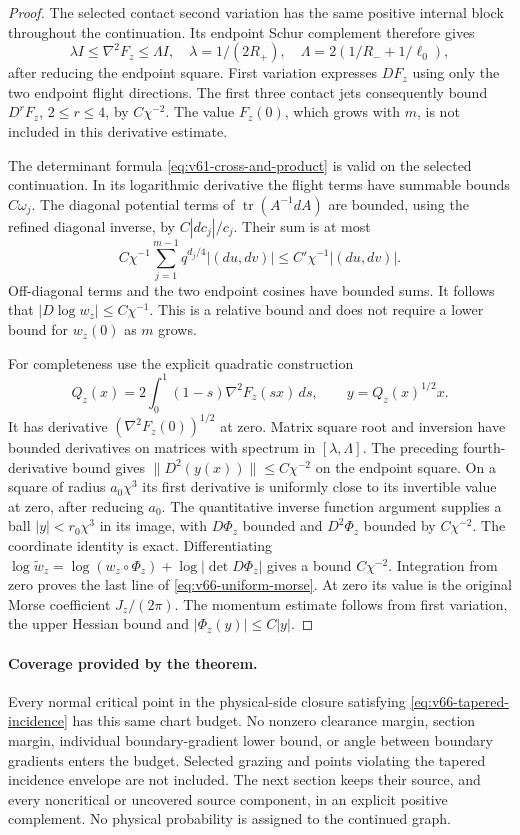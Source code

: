 \begin{proof}
The selected contact second variation has the same positive internal
block throughout the continuation. Its endpoint Schur complement
therefore gives
\[
 \lambda I\le \nabla^2F_z\le\Lambda I,
 \quad \lambda=1/(2R_+),\quad
 \Lambda=2(1/R_-+1/\ell_0),
\]
after reducing the endpoint square. First variation expresses $DF_z$
using only the two endpoint flight directions. The first three
contact jets consequently bound $D^rF_z$, $2\le r\le4$, by
$C\chi^{-2}$. The value $F_z(0)$, which grows with $m$, is not
included in this derivative estimate.

The determinant formula \eqref{eq:v61-cross-and-product} is valid on
the selected continuation. In its logarithmic derivative the flight
terms have summable bounds $C\omega_j$. The diagonal potential terms
of $\operatorname{tr}(A^{-1}dA)$ are bounded, using the refined diagonal
inverse, by $C|dc_j|/c_j$. Their sum is at most
\[
 C\chi^{-1}\sum_{j=1}^{m-1}q^{d_j/4}|(du,dv)|
                    \le C'\chi^{-1}|(du,dv)|.
\]
Off-diagonal terms and the two endpoint cosines have bounded sums.
It follows that $|D\log w_z|\le C\chi^{-1}$. This is a relative
bound and does not require a lower bound for $w_z(0)$ as $m$ grows.

For completeness use the explicit quadratic construction
\[
 Q_z(x)=2\int_0^1(1-s)\nabla^2F_z(sx)\,ds,
                  \qquad y=Q_z(x)^{1/2}x.
\]
It has derivative $(\nabla^2F_z(0))^{1/2}$ at zero. Matrix square
root and inversion have bounded derivatives on matrices with spectrum
in $[\lambda,\Lambda]$. The preceding fourth-derivative bound gives
$\|D^2(y(x))\|\le C\chi^{-2}$ on the endpoint square. On a square
of radius $a_0\chi^3$ its first derivative is uniformly close to its
invertible value at zero, after reducing $a_0$. The quantitative
inverse function argument supplies a ball $|y|<r_0\chi^3$ in its
image, with $D\Phi_z$ bounded and $D^2\Phi_z$ bounded by
$C\chi^{-2}$. The coordinate identity is exact. Differentiating
$\log\widetilde w_z=\log(w_z\circ\Phi_z)+\log|\det D\Phi_z|$
gives a bound $C\chi^{-2}$. Integration from zero proves the last
line of \eqref{eq:v66-uniform-morse}. At zero its value is the original
Morse coefficient $J_z/(2\pi)$. The momentum estimate follows from
first variation, the upper Hessian bound and $|\Phi_z(y)|\le C|y|$.
\end{proof}

\paragraph{Coverage provided by the theorem.}
Every normal critical point in the physical-side closure satisfying
\eqref{eq:v66-tapered-incidence} has this same chart budget. No
nonzero clearance margin, section margin, individual boundary-gradient
lower bound, or angle between boundary gradients enters the budget.
Selected grazing and points violating the tapered incidence envelope
are not included. The next section keeps their source, and every
noncritical or uncovered source component, in an explicit positive
complement. No physical probability is assigned to the continued graph.
